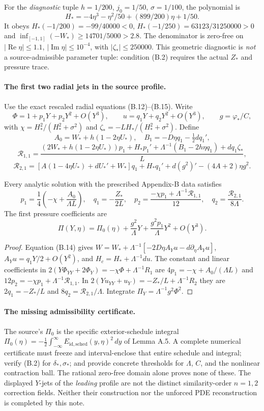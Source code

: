 For the \emph{diagnostic} tuple $h=1/200$, $j_0=1/50$,
$\sigma=1/100$, the polynomial is
\[
 H_*=-4\eta^3-\eta^2/50+(899/200)\eta+1/50.
\]
It obeys $H_*(-1/200)=-99/40000<0$,
$H_*(-1/250)=63123/31250000>0$ and
$\inf_{[-1,1]}(-W_*)\ge14701/5000>2.8$.
The denominator is zero-free on
$|\operatorname{Re}\eta|\le1.1$, $|\operatorname{Im}\eta|\le10^{-4}$,
with $|\zeta_*|\le250000$. This geometric diagnostic is
\emph{not} a source-admissible parameter tuple: condition (B.2)
requires the actual $Z_*$ and pressure trace.

\paragraph{The first two radial jets in the source profile.}
Use the exact rescaled radial equations (B.12)--(B.15). Write
\[
 \Phi=1+p_1Y+p_2Y^2+O(Y^3),\qquad
 u=q_1Y+q_2Y^2+O(Y^3),\qquad
 g=\varphi_*/C,
\]
with $\chi=H_*^2/(H_*^2+\sigma^2)$ and $\zeta_*=-LH_*/(H_*^2+\sigma^2)$. Define
\[
 A_0=W_*+h(1-2\eta U_*),\quad
 B_1=-D\eta q_1-\tfrac12d q_1',
\]
\[
 \mathcal R_{1,1}=
 \frac{(2W_*+h(1-2\eta U_*))p_1+H_*p_1'
       +\Lambda^{-1}(B_1-2h\eta q_1)+dq_1\zeta_*}{L},
\]
\[
 \mathcal R_{2,1}=
 [A(1-4\eta U_*)+dU_*'+W_*]q_1+H_*q_1'
       +d(g^2)'-(4A+2)\eta g^2.
\]
\begin{proposition}
\label{prop:axis-first-jets}
Every analytic solution with the prescribed Appendix-B data satisfies
\[
 p_1=\frac14\left(-\chi+\frac{A_0}{\Lambda L}\right),\quad
 q_1=-\frac{Z_*}{2L},\quad
 p_2=\frac{-\chi p_1+\Lambda^{-1}\mathcal R_{1,1}}{12},\quad
 q_2=\frac{\mathcal R_{2,1}}{8\Lambda}.
\]
The first pressure coefficients are
\[
 \Pi(Y,\eta)=\Pi_0(\eta)
 +\frac{g^2}{\Lambda}Y+\frac{g^2p_1}{\Lambda}Y^2+O(Y^3).
\]
\end{proposition}
\begin{proof}
Equation (B.14) gives
$W=W_*+\Lambda^{-1}[-2D\eta A_Yu-d\partial_\eta A_Yu]$,
$A_Yu=q_1Y/2+O(Y^2)$, and $H_c=H_*+\Lambda^{-1}du$.
The constant and linear coefficients in
$2(Y\Phi_{YY}+2\Phi_Y)=-\chi\Phi+\Lambda^{-1}R_1$
are $4p_1=-\chi+A_0/(\Lambda L)$ and
$12p_2=-\chi p_1+\Lambda^{-1}\mathcal R_{1,1}$.
In $2(Yu_{YY}+u_Y)=-Z_*/L+\Lambda^{-1}R_2$
they are $2q_1=-Z_*/L$ and
$8q_2=\mathcal R_{2,1}/\Lambda$.
Integrate $\Pi_Y=\Lambda^{-1}g^2\Phi^2$.
\end{proof}

\paragraph{The missing admissibility certificate.}
The source's $\Pi_0$ is the specific exterior-schedule integral
$\Pi_0(\eta)=-\frac12\int_{-\infty}^{\infty}
 E_{\mathrm{id,sched}}(y,\eta)^2\,dy$ of Lemma A.5.
A complete numerical certificate must freeze and interval-enclose
that entire schedule and integral; verify (B.2) for
$\delta_*,\sigma_*$; and provide concrete thresholds for
$\Lambda$, $C$, and the nonlinear contraction ball.
The rational zero-free domain alone proves none of these.
The displayed $Y$-jets of the \emph{leading} profile are not
the distinct similarity-order $n=1,2$ correction fields.
Neither their construction nor the unforced PDE reconstruction
is completed by this note.
